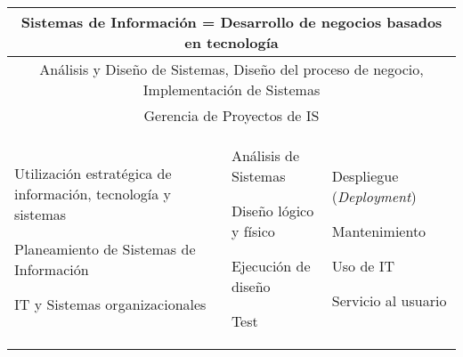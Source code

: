 \begin{center}
\begin{tabularx}{\textwidth}{|XXX|} \hline
\multicolumn{3}{|c|}{\textbf{Sistemas de Información = Desarrollo de negocios basados en tecnología}} \\ \hline
\multicolumn{3}{|c|}{Análisis y Diseño de Sistemas, Diseño del proceso de negocio, Implementación de Sistemas} \\
\multicolumn{3}{|c|}{Gerencia de Proyectos de IS} \\ \hline
\begin{capenv}
\item Utilización estratégica de información, tecnología y sistemas
\item Planeamiento de Sistemas de Información
\item \ac{IT} y Sistemas organizacionales
\end{capenv}
&
\begin{capenv}
\item Análisis de Sistemas
\item Diseño lógico y físico
\item Ejecución de diseño
\item Test
\end{capenv}
&
\begin{capenv}
\item Despliegue (\textit{Deployment})
\item Mantenimiento
\item Uso de \ac{IT}
\item Servicio al usuario
\end{capenv} \\ \hline

\end{tabularx}
\end{center}